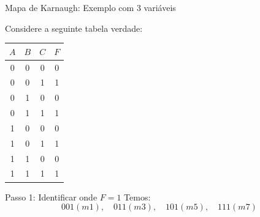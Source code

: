 \begin{frame}{Mapa de Karnaugh: Exemplo com 3 variáveis}
    \small

    Considere a seguinte tabela verdade:

    \begin{center}
        \begin{tabular}{c c c | c}
            $A$ & $B$ & $C$ & $F$ \\ \hline
            0 & 0 & 0 & 0 \\
            0 & 0 & 1 & 1 \\
            0 & 1 & 0 & 0 \\
            0 & 1 & 1 & 1 \\
            1 & 0 & 0 & 0 \\
            1 & 0 & 1 & 1 \\
            1 & 1 & 0 & 0 \\
            1 & 1 & 1 & 1
        \end{tabular}
    \end{center}

    \begin{block}{Passo 1: Identificar onde $F=1$}
        Temos:
        \[
            001 (m1),\quad 011 (m3),\quad 101 (m5),\quad 111 (m7)
        \]

    \end{block}

\end{frame}